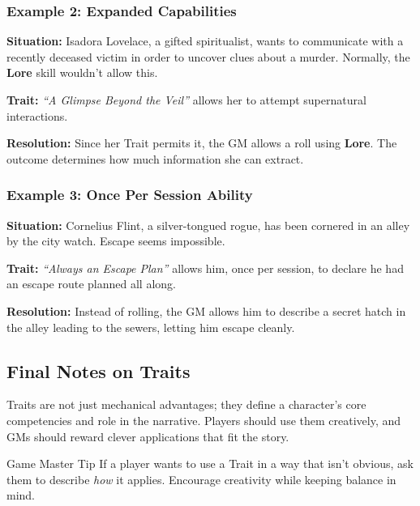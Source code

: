 \subsubsection{Example 2: Expanded Capabilities}
\begin{DndReadAloud}{}
	\textbf{Situation:} Isadora Lovelace, a gifted spiritualist, wants to communicate with a recently deceased victim in order to uncover clues about a murder. Normally, the \textbf{Lore} skill wouldn’t allow this.

	\noindent\textbf{Trait:} \emph{“A Glimpse Beyond the Veil”} allows her to attempt supernatural interactions.

	\noindent\textbf{Resolution:} Since her Trait permits it, the GM allows a roll using \textbf{Lore}. The outcome determines how much information she can extract.
\end{DndReadAloud}

\subsubsection{Example 3: Once Per Session Ability}
\begin{DndReadAloud}{}
	\textbf{Situation:} Cornelius Flint, a silver-tongued rogue, has been cornered in an alley by the city watch. Escape seems impossible.

	\noindent\textbf{Trait:} \emph{“Always an Escape Plan”} allows him, once per session, to declare he had an escape route planned all along.

	\noindent\textbf{Resolution:} Instead of rolling, the GM allows him to describe a secret hatch in the alley leading to the sewers, letting him escape cleanly.
\end{DndReadAloud}
 
\subsection{Final Notes on Traits}

Traits are not just mechanical advantages; they define a character’s core competencies and role in the narrative. Players should use them creatively, and GMs should reward clever applications that fit the story.

\begin{DndComment}{Game Master Tip}
 	If a player wants to use a Trait in a way that isn’t obvious, ask them to describe \emph{how} it applies. Encourage creativity while keeping balance in mind.
\end{DndComment}

